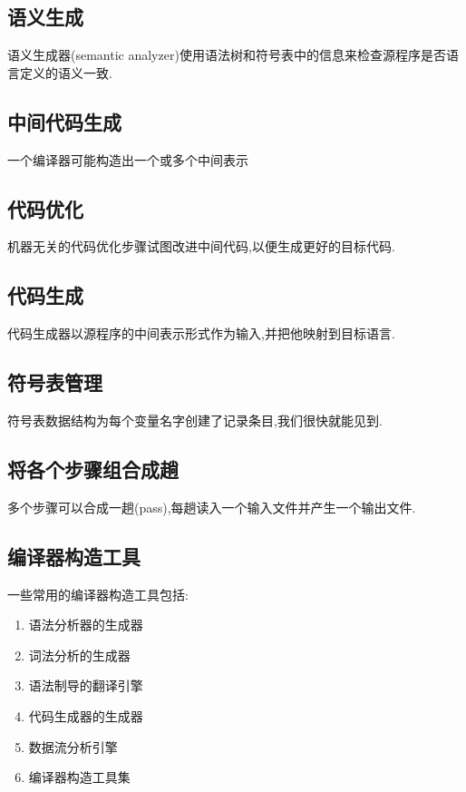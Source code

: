 \documentclass[UTF8]{ctexart}
\begin{document}
    \subsection{语义生成}
    
    语义生成器(semantic analyzer)使用语法树和符号表中的信息来检查源程序是否语言定义的语义一致.

    \subsection{中间代码生成}

    一个编译器可能构造出一个或多个中间表示

    \subsection{代码优化}

    机器无关的代码优化步骤试图改进中间代码,以便生成更好的目标代码.

    \subsection{代码生成}

    代码生成器以源程序的中间表示形式作为输入,并把他映射到目标语言.

    \subsection{符号表管理}

    符号表数据结构为每个变量名字创建了记录条目,我们很快就能见到.

    \subsection{将各个步骤组合成趟}

    多个步骤可以合成一趟(pass),每趟读入一个输入文件并产生一个输出文件.

    \subsection{编译器构造工具}

    一些常用的编译器构造工具包括:
    \begin{enumerate}[(1)]
    \item 语法分析器的生成器
    \item 词法分析的生成器
    \item 语法制导的翻译引擎
    \item 代码生成器的生成器
    \item 数据流分析引擎
    \item 编译器构造工具集
    \end{enumerate}
    
\end{document}

